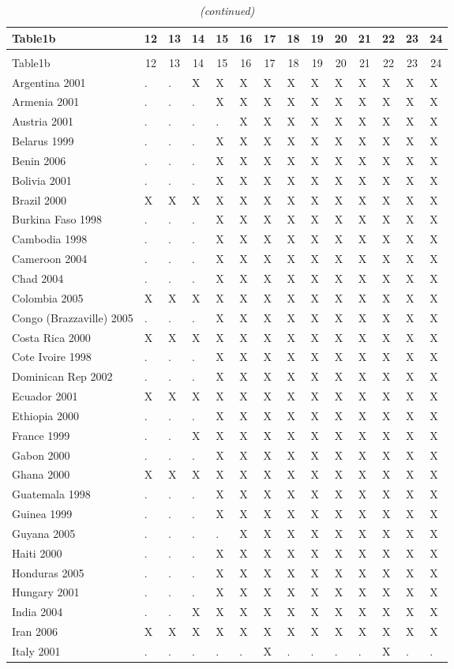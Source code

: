 \documentclass[a4paper]{article}
\begin{document}
\setlongtables


\begin{longtable}{llllllllllllll} \caption{Availability Has Child}\tabularnewline
 \hline\hline
\multicolumn{1}{l}{Table1b}&\multicolumn{1}{c}{12}&\multicolumn{1}{c}{13}&\multicolumn{1}{c}{14}&\multicolumn{1}{c}{15}&\multicolumn{1}{c}{16}&\multicolumn{1}{c}{17}&\multicolumn{1}{c}{18}&\multicolumn{1}{c}{19}&\multicolumn{1}{c}{20}&\multicolumn{1}{c}{21}&\multicolumn{1}{c}{22}&\multicolumn{1}{c}{23}&\multicolumn{1}{c}{24}\tabularnewline
\hline
\endfirsthead
\caption[]{\em (continued)} \tabularnewline
\hline
\multicolumn{1}{l}{Table1b}&\multicolumn{1}{c}{12}&\multicolumn{1}{c}{13}&\multicolumn{1}{c}{14}&\multicolumn{1}{c}{15}&\multicolumn{1}{c}{16}&\multicolumn{1}{c}{17}&\multicolumn{1}{c}{18}&\multicolumn{1}{c}{19}&\multicolumn{1}{c}{20}&\multicolumn{1}{c}{21}&\multicolumn{1}{c}{22}&\multicolumn{1}{c}{23}&\multicolumn{1}{c}{24}\tabularnewline
\hline
\endhead
\hline
\endfoot
\label{Table1b}
Argentina 2001&.&.&X&X&X&X&X&X&X&X&X&X&X\tabularnewline
Armenia 2001&.&.&.&X&X&X&X&X&X&X&X&X&X\tabularnewline
Austria 2001&.&.&.&.&X&X&X&X&X&X&X&X&X\tabularnewline
Belarus 1999&.&.&.&X&X&X&X&X&X&X&X&X&X\tabularnewline
Benin 2006&.&.&.&X&X&X&X&X&X&X&X&X&X\tabularnewline
Bolivia 2001&.&.&.&X&X&X&X&X&X&X&X&X&X\tabularnewline
Brazil 2000&X&X&X&X&X&X&X&X&X&X&X&X&X\tabularnewline
Burkina Faso 1998&.&.&.&X&X&X&X&X&X&X&X&X&X\tabularnewline
Cambodia 1998&.&.&.&X&X&X&X&X&X&X&X&X&X\tabularnewline
Cameroon 2004&.&.&.&X&X&X&X&X&X&X&X&X&X\tabularnewline
Chad 2004&.&.&.&X&X&X&X&X&X&X&X&X&X\tabularnewline
Colombia 2005&X&X&X&X&X&X&X&X&X&X&X&X&X\tabularnewline
Congo (Brazzaville) 2005&.&.&.&X&X&X&X&X&X&X&X&X&X\tabularnewline
Costa Rica 2000&X&X&X&X&X&X&X&X&X&X&X&X&X\tabularnewline
Cote Ivoire 1998&.&.&.&X&X&X&X&X&X&X&X&X&X\tabularnewline
Dominican Rep 2002&.&.&.&X&X&X&X&X&X&X&X&X&X\tabularnewline
Ecuador 2001&X&X&X&X&X&X&X&X&X&X&X&X&X\tabularnewline
Ethiopia 2000&.&.&.&X&X&X&X&X&X&X&X&X&X\tabularnewline
France 1999&.&.&X&X&X&X&X&X&X&X&X&X&X\tabularnewline
Gabon 2000&.&.&.&X&X&X&X&X&X&X&X&X&X\tabularnewline
Ghana 2000&X&X&X&X&X&X&X&X&X&X&X&X&X\tabularnewline
Guatemala 1998&.&.&.&X&X&X&X&X&X&X&X&X&X\tabularnewline
Guinea 1999&.&.&.&X&X&X&X&X&X&X&X&X&X\tabularnewline
Guyana 2005&.&.&.&.&X&X&X&X&X&X&X&X&X\tabularnewline
Haiti 2000&.&.&.&X&X&X&X&X&X&X&X&X&X\tabularnewline
Honduras 2005&.&.&.&X&X&X&X&X&X&X&X&X&X\tabularnewline
Hungary 2001&.&.&.&X&X&X&X&X&X&X&X&X&X\tabularnewline
India 2004&.&.&X&X&X&X&X&X&X&X&X&X&X\tabularnewline
Iran 2006&X&X&X&X&X&X&X&X&X&X&X&X&X\tabularnewline
Italy 2001&.&.&.&.&.&X&.&.&.&.&X&.&.\tabularnewline

\end{longtable}
\end{document}

